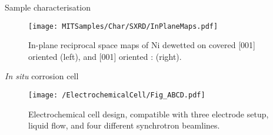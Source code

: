 \begin{column}{\colwidth}
\begin{block}{Sample characterisation}
        \begin{figure}
            \centering
            \texttt{[image: MITSamples/Char/SXRD/InPlaneMaps.pdf]}
            \caption{
            In-plane reciprocal space maps of Ni dewetted on  covered [001] oriented  (left), and [001] oriented : (right).
            }
        \end{figure}

    \end{block}

    \begin{block}{\textit{In situ} corrosion cell}
        \begin{figure}
            \centering
            \texttt{[image: /ElectrochemicalCell/Fig\_ABCD.pdf]}
            \caption{Electrochemical cell design, compatible with three electrode setup, liquid flow, and four different synchrotron beamlines.}
        \end{figure}
    \end{block}

\end{column}
